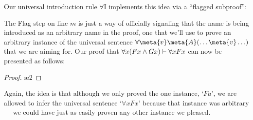 Our universal introduction rule $\forall$I implements this idea via a ``flagged subproof'':

The Flag step on line $m$ is just a way of officially signaling that the name  is being introduced as an arbitrary name in the proof, one that we'll use to prove an arbitrary instance of the universal sentence $\forall \meta{v}\meta{A}(\ldots \meta{v} \ldots)$ that we are aiming for.  Our proof that $\forall x (Fx \wedge Gx) \vdash \forall x Fx$ can now be presented as follows:

\begin{proof}
	\open
	 \fl{}
	 
	 \ae{2}
	\close
	 
\end{proof}
Again, the idea is that although we only proved the one instance, `$Fa$', we are allowed to infer the universal sentence `$\forall xFx$' because that instance was arbitrary --- we could have just as easily proven any other instance we pleased.


